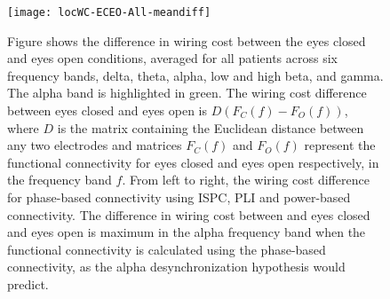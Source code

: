 \documentclass[11pt, onecolumn]{article}
\begin{document}

\begin{figure}[h]
        \centering
        \texttt{[image: locWC-ECEO-All-meandiff]}
        \caption{Figure shows the difference in wiring cost between the eyes closed and eyes open conditions, averaged for all patients across six frequency bands, delta, theta, alpha, low and high beta, and gamma. The alpha band is highlighted in green. The wiring cost difference between eyes closed and eyes open is ${D}(F_C(f)- F_O(f))$, where $D$ is the matrix containing the Euclidean distance between any two electrodes and matrices $F_C(f)$ and $F_O(f)$ represent the functional connectivity for eyes closed and eyes open respectively, in the frequency band $f$. From left to right, the wiring cost difference for phase-based connectivity using ISPC, PLI and power-based connectivity. The difference in wiring cost between and eyes closed and eyes open is maximum in the alpha frequency band when the functional connectivity is calculated using the phase-based connectivity, as the alpha desynchronization hypothesis would predict.}
\label{fig:figi-1}
\end{figure}
 
\end{document}
